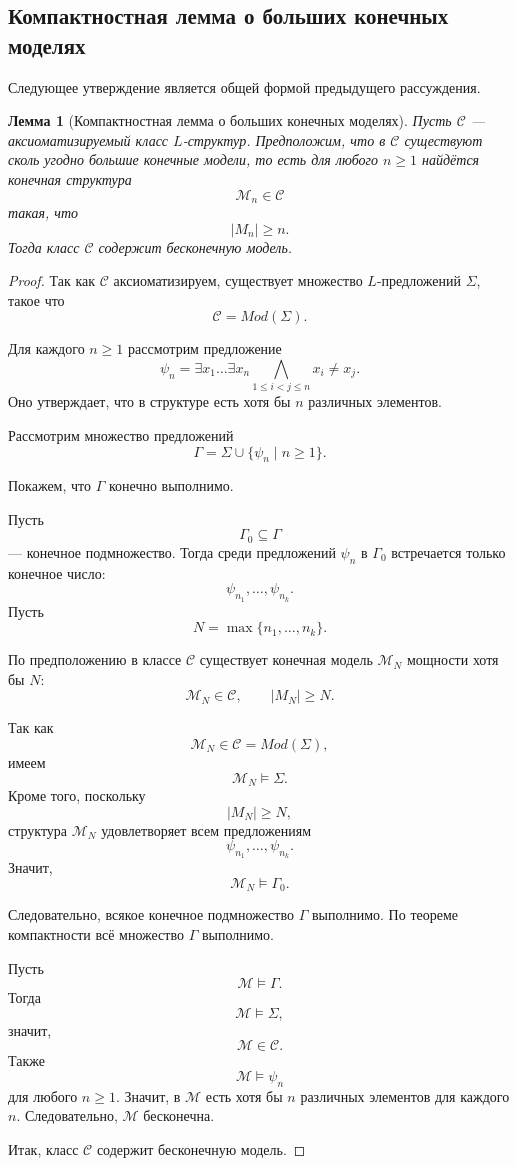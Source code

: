 \documentclass[12pt,a4paper,oneside,openany]{book}
\theoremstyle{definition}
\theoremstyle{plain}
\newtheorem{lemma}{Лемма}[chapter]
\theoremstyle{remark}
\begin{document}
\subsection{Компактностная лемма о больших конечных моделях}

Следующее утверждение является общей формой предыдущего рассуждения.

\begin{lemma}[Компактностная лемма о больших конечных моделях]
Пусть $\mathcal C$ — аксиоматизируемый класс $L$-структур. Предположим, что в $\mathcal C$ существуют сколь угодно большие конечные модели, то есть для любого $n\ge 1$ найдётся конечная структура
\[
\mathcal M_n\in\mathcal C
\]
такая, что
\[
|M_n|\ge n.
\]
Тогда класс $\mathcal C$ содержит бесконечную модель.
\end{lemma}

\begin{proof}
Так как $\mathcal C$ аксиоматизируем, существует множество $L$-предложений $\Sigma$, такое что
\[
\mathcal C=Mod(\Sigma).
\]

Для каждого $n\ge 1$ рассмотрим предложение
\[
\psi_n
=
\exists x_1\ldots\exists x_n
\bigwedge_{1\le i<j\le n} x_i\ne x_j.
\]
Оно утверждает, что в структуре есть хотя бы $n$ различных элементов.

Рассмотрим множество предложений
\[
\Gamma
=
\Sigma\cup\{\psi_n\mid n\ge 1\}.
\]

Покажем, что $\Gamma$ конечно выполнимо.

Пусть
\[
\Gamma_0\subseteq\Gamma
\]
— конечное подмножество. Тогда среди предложений $\psi_n$ в $\Gamma_0$ встречается только конечное число:
\[
\psi_{n_1},\ldots,\psi_{n_k}.
\]
Пусть
\[
N=\max\{n_1,\ldots,n_k\}.
\]

По предположению в классе $\mathcal C$ существует конечная модель $\mathcal M_N$ мощности хотя бы $N$:
\[
\mathcal M_N\in\mathcal C,
\qquad
|M_N|\ge N.
\]

Так как
\[
\mathcal M_N\in\mathcal C=Mod(\Sigma),
\]
имеем
\[
\mathcal M_N\models\Sigma.
\]
Кроме того, поскольку
\[
|M_N|\ge N,
\]
структура $\mathcal M_N$ удовлетворяет всем предложениям
\[
\psi_{n_1},\ldots,\psi_{n_k}.
\]
Значит,
\[
\mathcal M_N\models\Gamma_0.
\]

Следовательно, всякое конечное подмножество $\Gamma$ выполнимо. По теореме компактности всё множество $\Gamma$ выполнимо.

Пусть
\[
\mathcal M\models\Gamma.
\]
Тогда
\[
\mathcal M\models\Sigma,
\]
значит,
\[
\mathcal M\in\mathcal C.
\]
Также
\[
\mathcal M\models\psi_n
\]
для любого $n\ge 1$. Значит, в $\mathcal M$ есть хотя бы $n$ различных элементов для каждого $n$. Следовательно, $\mathcal M$ бесконечна.

Итак, класс $\mathcal C$ содержит бесконечную модель.
\end{proof}
\end{document}
